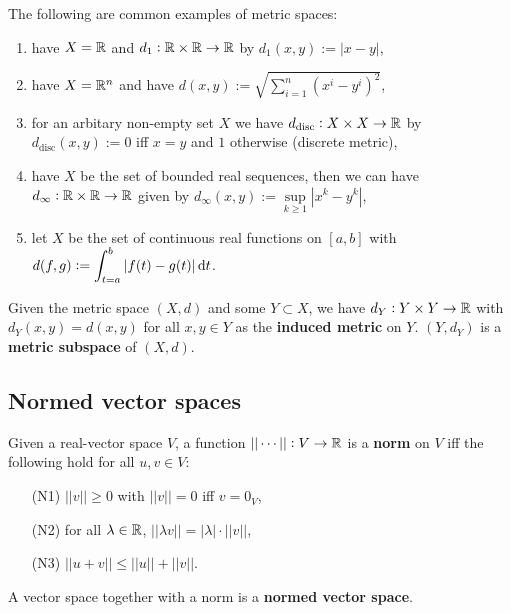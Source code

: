 \documentclass[../Year2.tex]{subfiles}
\begin{document}
\begin{examples}
    The following are common examples of metric spaces: \begin{enumerate}
        \item have $X=\mathbb{R}$ and $d_1:\mathbb{R}\times\mathbb{R}\rightarrow\mathbb{R}$ by $d_1(x,y):=|x-y|$,
        \item have $X=\mathbb{R}^n$ and have $\displaystyle d(x,y):=\sqrt{\sum_{i=1}^n{(x^i-y^i)}^2}$,
        \item for an arbitary non-empty set $X$ we have $d_\text{disc}:X\times X\rightarrow\mathbb{R}$ by $d_\text{disc}(x,y):=0$ iff $x=y$ and $1$ otherwise (discrete metric),
        \item have $X$ be the set of bounded real sequences, then we can have $d_\infty:\mathbb{R}\times\mathbb{R}\rightarrow\mathbb{R}$ given by $d_\infty(x,y) := \sup\limits_{k\geq1}|x^k-y^k|$,
        \vspace{-10pt}
        \item let $X$ be the set of continuous real functions on $[a,b]$ with $\displaystyle d(f,g):=\intd{t=a}{b}{|f(t)-g(t)|}{t}$.
    \end{enumerate}
\end{examples}

\begin{definition}
    Given the metric space $(X,d)$ and some $Y\subset X$, we have $d_Y:Y\times Y\rightarrow\mathbb{R}$ with $d_Y(x,y)=d(x,y)$ for all $x,y\in Y$ as the \textbf{induced metric} on $Y$. $(Y,d_Y)$ is a \textbf{metric subspace} of $(X,d)$.
\end{definition}

\subsection{Normed vector spaces}

\begin{definition}
    Given a real-vector space $V$, a function $||\cdots||:V\rightarrow\mathbb{R}$ is a \textbf{norm} on $V$ iff the following hold for all $u,v\in V$:\begin{enumerate}
        \item[(N1)] $||v||\geq 0$ with $||v||=0$ iff $v=0_V$,
        \item[(N2)] for all $\lambda\in\mathbb{R}$, $||\lambda v|| = |\lambda|\cdot||v||$,
        \item[(N3)] $||u+v||\leq||u||+||v||$.
    \end{enumerate} A vector space together with a norm is a \textbf{normed vector space}.
\end{definition}
\end{document}
